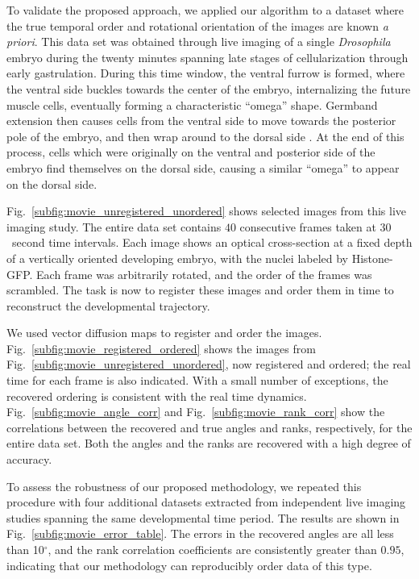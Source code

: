 \documentclass{pnastwo}
\newcommand{\fig}[0]{Fig.}
\begin{document}
\begin{article}
To validate the proposed approach, we applied our algorithm to a dataset where the true temporal order and rotational orientation of the images are known {\em a priori}.
%
This data set was obtained through live imaging of a single {\it Drosophila} embryo during the twenty minutes spanning late stages of cellularization through early gastrulation.
%
During this time window, the ventral furrow is formed, where the ventral side buckles towards the center of the embryo, internalizing the future muscle cells, eventually forming a characteristic ``omega'' shape.
%
Germband extension then causes cells from the ventral side to move towards the posterior pole of the embryo, and then wrap around to the dorsal side \cite{leptin2005gastrulation}.
%
At the end of this process, cells which were originally on the ventral and posterior side of the embryo find themselves on the dorsal side, causing a similar ``omega'' to appear on the dorsal side.

\fig~\ref{subfig:movie_unregistered_unordered} shows selected images from this live imaging study. 
%
The entire data set contains $40$ consecutive frames taken at $30$~second time intervals.
%
Each image shows an optical cross-section at a fixed depth of a vertically oriented developing embryo, with the nuclei labeled by Histone-GFP.
%
Each frame was arbitrarily rotated, and the order of the frames was scrambled.
%
The task is now to register these images and order them in time to reconstruct the developmental trajectory.

We used vector diffusion maps to register and order the images. 
%
\fig~\ref{subfig:movie_registered_ordered} shows the images from \fig~\ref{subfig:movie_unregistered_unordered}, now registered and ordered; the real time for each frame is also indicated.
%
With a small number of exceptions, the recovered ordering is consistent with the real time dynamics. 
%
\fig~\ref{subfig:movie_angle_corr} and \fig~\ref{subfig:movie_rank_corr}  show the correlations between the recovered and true angles and ranks, respectively, for the entire data set. 
%
Both the angles and the ranks are recovered with a high degree of accuracy.

To assess the robustness of our proposed methodology, we repeated this procedure with four additional datasets extracted from independent live imaging studies spanning the same developmental time period. 
%
The results are shown in \fig~\ref{subfig:movie_error_table}. 
%
The errors in the recovered angles are all less than 10$^\circ$, and the rank correlation coefficients are consistently greater than $0.95$, indicating that our methodology can reproducibly order data of this type. 


\end{article}
\end{document}
